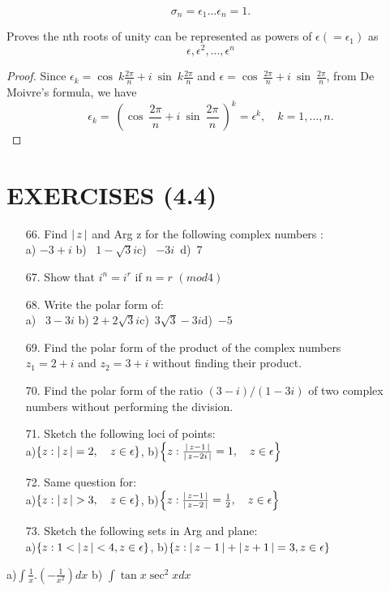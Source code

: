\documentclass[11pt]{amsbook}
\begin{document}
$$\sigma_{n} = \epsilon_{1} \dotsc \epsilon_{n} = 1 . $$
\begin{exmp}
Proves the nth roots of unity can be represented as powers of $\epsilon\left(=\epsilon_1\right)$ as$$\epsilon,\epsilon^2,\dotsc,\epsilon^n$$
\end{exmp}
\begin{proof}
Since $\epsilon_k=\cos\ k  \frac{2\pi}{n}+i\ \sin\ k  \frac{2\pi}{n}$ and $\epsilon=\cos\ \frac{2\pi}{n}+i\ \sin\ \frac{2\pi}{n}$,
from De Moivre's formula, we have
$$\epsilon_k=\ \left(\cos\ \frac{2\pi}{n}+i\ \sin\ \frac{2\pi}{n}\ \right)^k=\epsilon^k,\quad k=1,\dotsc,n.$$
\end{proof}
\section{EXERCISES (4.4)}

\begin{enumerate}
    \item[66.] Find $\left \lvert \, z \, \right \rvert$ and Arg z for the following complex numbers : \\
    a) $-3+i$ \qquad b) \ $1-\sqrt{3}i$\qquad c) \ $-3i$\qquad\ \qquad  d)\ $7$
    \item[67.]Show that $i^n=i^r$ if $n=r$ \quad $\left(mod 4\right)$
    \item[68.]Write the polar form of: \\
    a) \ $3-3i$ \qquad b) $2+2\sqrt{3}i$\qquad c)\ $3\sqrt{3}-3i$\qquad d)\ $-5$
    \item[69.]Find the polar form of the product of the complex numbers \\
    $z_1=2+i$ and $z_2=3+i$ without finding their product.
    \item[70.]Find the polar form of the ratio $\left(3-i\right)/\left(1-3i\right)$ of two complex numbers without performing the division.
    \item[71.]Sketch the following loci of points: \\
    a)$\left\{z: \left \lvert \, z \, \right \rvert=2,\quad  z \in \epsilon \right\}$, \qquad
    b)$\left\{z: \frac{\left \lvert \, z-1 \, \right \rvert}{\left \lvert \, z-2i \, \right \rvert}=1,\quad  z \in \epsilon \right\}$
    \item[72.]Same question for: \\
    a)$\left\{z: \left \lvert \, z \, \right \rvert>3,\quad  z \in \epsilon \right\}$, \qquad
    b)$\left\{z: \frac{\left \lvert \, z-1 \, \right \rvert}{\left \lvert \, z-2 \, \right \rvert}=\frac{1}{2},\quad  z \in \epsilon \right\}$
    \item[73.]Sketch the following sets in Arg and plane: \\
    a)$\left\{z: 1<\left \lvert \, z \, \right \rvert<4, z \in \epsilon \right\}$, \qquad 
    b)$\left\{z: \left \lvert \, z-1 \, \right \rvert+\left \lvert \, z+1 \, \right \rvert=3, z \in \epsilon \right\}$
\end{enumerate}
 	\quad a)$ \int \frac{1}{x}  . (-\frac{1}{x^2})dx $    \quad \quad \quad \quad \quad \quad \quad \quad b) $ \int \tan x \sec ^2x dx $ \\
\end{document}
